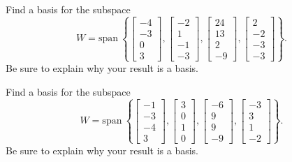 \documentclass{article}
\begin{document}
\begin{exerciseStatement}
    Find a basis for the subspace
\[W=\mathrm{span}\ \left\{\left[\begin{array}{r}
-4 \\
-3 \\
0 \\
3
\end{array}\right] , \left[\begin{array}{r}
-2 \\
1 \\
-1 \\
-3
\end{array}\right] , \left[\begin{array}{r}
24 \\
13 \\
2 \\
-9
\end{array}\right] , \left[\begin{array}{r}
2 \\
-2 \\
-3 \\
-3
\end{array}\right]\right\}.\]
 Be sure to explain why your result is a basis.


  
\end{exerciseStatement}

\begin{exerciseStatement}
    Find a basis for the subspace
\[W=\mathrm{span}\ \left\{\left[\begin{array}{r}
-1 \\
-3 \\
-4 \\
3
\end{array}\right] , \left[\begin{array}{r}
3 \\
0 \\
1 \\
0
\end{array}\right] , \left[\begin{array}{r}
-6 \\
9 \\
9 \\
-9
\end{array}\right] , \left[\begin{array}{r}
-3 \\
3 \\
1 \\
-2
\end{array}\right]\right\}.\]
 Be sure to explain why your result is a basis.


  
\end{exerciseStatement}
\end{document}
